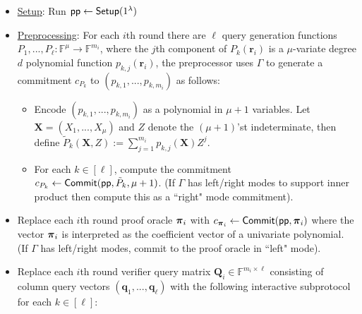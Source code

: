 \begin{itemize}

\item \underline{Setup}: Run $\textsf{pp} \leftarrow \textsf{{Setup}}(1^\lambda)$

\item \underline{Preprocessing}: For each $i$th round there are $\ell$ query generation functions $P_1,...,P_\ell: \mathbb{F}^\mu \rightarrow \mathbb{F}^{m_i}$, where the $j$th component of $P_k(\mathbf{r}_i)$ is a $\mu$-variate degree $d$ polynomial function $p_{k,j}(\mathbf{r}_i)$, the preprocessor uses $\Gamma$ to generate a commitment $c_{P_k}$ to $(p_{k,1},..., p_{k,m_i})$ as follows:
 
    \begin{itemize}
    \item Encode $(p_{k,1},...,p_{k, m_i})$ as a polynomial in $\mu + 1$ variables. Let $\mathbf{X} = (X_1,...,X_\mu)$ and $Z$ denote the $(\mu+1)$'st indeterminate, then define $\tilde{P}_k(\mathbf{X}, Z) := \sum_{j=1}^{m_i} p_{k,j}(\mathbf{X}) Z^j$.
    
    \item For each $k \in [\ell]$, compute the commitment $c_{P_k} \leftarrow \textsf{{Commit}}(\textsf{pp}, \tilde{P}_k, \mu + 1)$. (If $\Gamma$ has left/right modes to support inner product then compute this as a ``right" mode commitment). 
    \end{itemize}
    
\item Replace each $i$th round proof oracle $\boldsymbol{\pi}_i$ with $c_{\boldsymbol{\pi}_i} \leftarrow \textsf{{Commit}}(\textsf{pp}, \boldsymbol{\pi}_i)$ where the vector $\boldsymbol{\pi}_i$ is interpreted as the coefficient vector of a univariate polynomial. (If $\Gamma$ has left/right modes, commit to the proof oracle in ``left" mode). 

\item Replace each $i$th round verifier query matrix $\mathbf{Q}_i \in \mathbb{F}^{m_i \times \ell}$ consisting of column query vectors $(\mathbf{q}_1,...,\mathbf{q}_\ell)$ with the following interactive subprotocol for each $k \in [\ell]$: 


\end{itemize}
